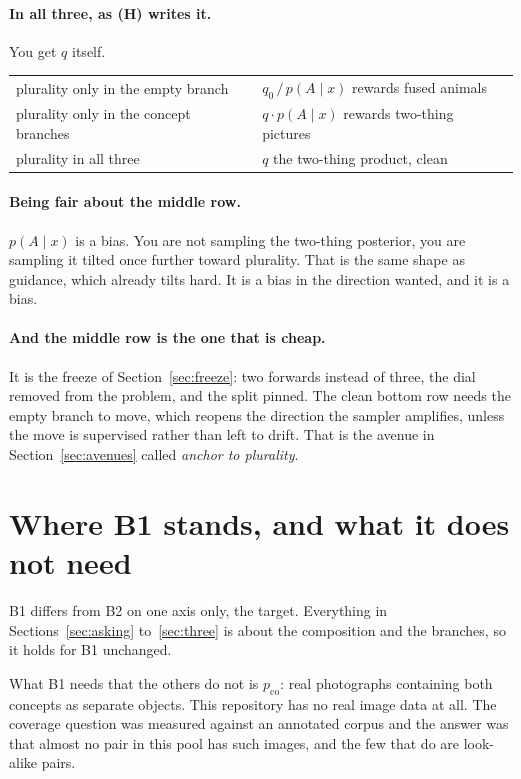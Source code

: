\documentclass[11pt]{article}
\begin{document}
\paragraph{In all three, as (H) writes it.} You get $q$ itself.

\begin{center}
\begin{tabular}{ll}
\toprule
plurality only in the empty branch & $q_0 \,/\, p(A\mid x)$ \quad rewards fused animals \\
plurality only in the concept branches & $q \cdot p(A\mid x)$ \quad rewards two-thing pictures \\
plurality in all three & $q$ \quad the two-thing product, clean \\
\bottomrule
\end{tabular}
\end{center}

\paragraph{Being fair about the middle row.}
$p(A\mid x)$ is a bias. You are not sampling the two-thing posterior, you are sampling it tilted
once further toward plurality. That is the same shape as guidance, which already tilts hard. It is
a bias in the direction wanted, and it is a bias.

\paragraph{And the middle row is the one that is cheap.}
It is the freeze of Section~\ref{sec:freeze}: two forwards instead of three, the dial removed from
the problem, and the split pinned. The clean bottom row needs the empty branch to move, which
reopens the direction the sampler amplifies, unless the move is supervised rather than left to
drift. That is the avenue in Section~\ref{sec:avenues} called \emph{anchor to plurality}.

\section{Where B1 stands, and what it does not need}

B1 differs from B2 on one axis only, the target. Everything in
Sections~\ref{sec:asking} to~\ref{sec:three} is about the composition and the branches, so it holds
for B1 unchanged.

What B1 needs that the others do not is $p_{\mathrm{co}}$: real photographs containing both concepts
as separate objects. This repository has no real image data at all. The coverage question was
measured against an annotated corpus and the answer was that almost no pair in this pool has such
images, and the few that do are look-alike pairs.
\end{document}
